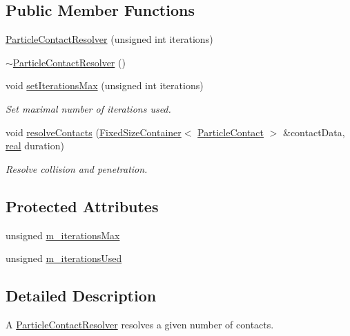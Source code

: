 \subsection*{Public Member Functions}
\begin{DoxyCompactItemize}
\item 
\mbox{\hyperlink{classr3_1_1_particle_contact_resolver_a37050bf25f0607a9290444121c56ee8f}{Particle\+Contact\+Resolver}} (unsigned int iterations)
\item 
\mbox{\hyperlink{classr3_1_1_particle_contact_resolver_ae7754eccf43c97727f1ecfac643cbd5b}{$\sim$\+Particle\+Contact\+Resolver}} ()
\item 
void \mbox{\hyperlink{classr3_1_1_particle_contact_resolver_a631df60543a1709a7c48dcf56490b3d2}{set\+Iterations\+Max}} (unsigned int iterations)
\begin{DoxyCompactList}\small\item\em Set maximal number of iterations used. \end{DoxyCompactList}\item 
void \mbox{\hyperlink{classr3_1_1_particle_contact_resolver_a756e60ebdfa7811c711015a8c61e7ff3}{resolve\+Contacts}} (\mbox{\hyperlink{classr3_1_1_fixed_size_container}{Fixed\+Size\+Container}}$<$ \mbox{\hyperlink{classr3_1_1_particle_contact}{Particle\+Contact}} $>$ \&contact\+Data, \mbox{\hyperlink{namespacer3_ab2016b3e3f743fb735afce242f0dc1eb}{real}} duration)
\begin{DoxyCompactList}\small\item\em Resolve collision and penetration. \end{DoxyCompactList}\end{DoxyCompactItemize}
\subsection*{Protected Attributes}
\begin{DoxyCompactItemize}
\item 
unsigned \mbox{\hyperlink{classr3_1_1_particle_contact_resolver_a4533db9c8dc455ad5b8c8f9e37db5392}{m\+\_\+iterations\+Max}}
\item 
unsigned \mbox{\hyperlink{classr3_1_1_particle_contact_resolver_a07536069a9a6a73c45794baf8579b845}{m\+\_\+iterations\+Used}}
\end{DoxyCompactItemize}


\subsection{Detailed Description}
A \mbox{\hyperlink{classr3_1_1_particle_contact_resolver}{Particle\+Contact\+Resolver}} resolves a given number of contacts. 

